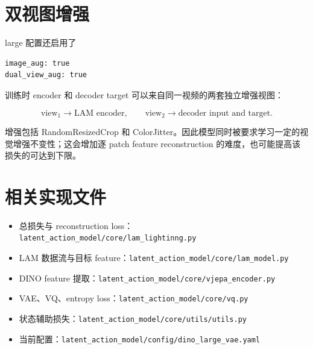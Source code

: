 \documentclass[UTF8,a4paper,11pt]{ctexart}
\begin{document}
\section{双视图增强}

large 配置还启用了

\begin{verbatim}
image_aug: true
dual_view_aug: true
\end{verbatim}

训练时 encoder 和 decoder target 可以来自同一视频的两套独立增强视图：

\begin{equation*}
\text{view}_1\rightarrow\text{LAM encoder},\qquad
\text{view}_2\rightarrow\text{decoder input and target}.
\end{equation*}

增强包括 RandomResizedCrop 和 ColorJitter。因此模型同时被要求学习一定的视觉增强不变性；这会增加逐 patch feature reconstruction 的难度，也可能提高该损失的可达到下限。

\section{相关实现文件}

\begin{itemize}[nosep]
  \item 总损失与 reconstruction loss：\texttt{latent\_action\_model/core/lam\_lightinng.py}
  \item LAM 数据流与目标 feature：\texttt{latent\_action\_model/core/lam\_model.py}
  \item DINO feature 提取：\texttt{latent\_action\_model/core/vjepa\_encoder.py}
  \item VAE、VQ、entropy loss：\texttt{latent\_action\_model/core/vq.py}
  \item 状态辅助损失：\texttt{latent\_action\_model/core/utils/utils.py}
  \item 当前配置：\texttt{latent\_action\_model/config/dino\_large\_vae.yaml}
\end{itemize}
\end{document}
